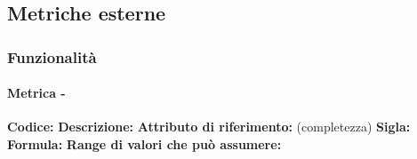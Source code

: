 \subsection{Metriche esterne}
   \subsubsection{Funzionalità}
        \paragraph{Metrica - } 
            \textbf{Codice:}
            \textbf{Descrizione:}
            \textbf{Attributo di riferimento:} (completezza)
            \textbf{Sigla:}
            \textbf{Formula:}
           \textbf{Range di valori che può assumere:}
           

           

